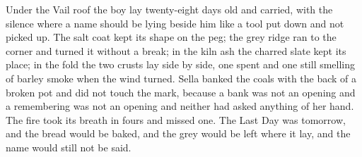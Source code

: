 Under the Vail roof the boy lay twenty-eight days old and carried, with the silence where a name should be lying beside him like a tool put down and not picked up. The salt coat kept its shape on the peg; the grey ridge ran to the corner and turned it without a break; in the kiln ash the charred slate kept its place; in the fold the two crusts lay side by side, one spent and one still smelling of barley smoke when the wind turned. Sella banked the coals with the back of a broken pot and did not touch the mark, because a bank was not an opening and a remembering was not an opening and neither had asked anything of her hand. The fire took its breath in fours and missed one. The Last Day was tomorrow, and the bread would be baked, and the grey would be left where it lay, and the name would still not be said.
